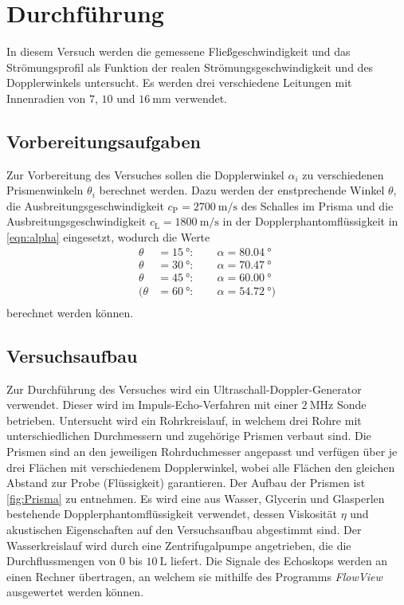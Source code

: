 \section{Durchführung}
\label{sec:Durchführung}
In diesem Versuch werden die gemessene Fließgeschwindigkeit und das Strömungsprofil als Funktion der realen Strömungsgeschwindigkeit und des Dopplerwinkels untersucht. 
Es werden drei verschiedene Leitungen mit Innenradien von $7$, $10$ und $\qty{16}{\milli\metre}$ verwendet. 

\subsection{Vorbereitungsaufgaben}
\label{subsec:Vorbereitung}
Zur Vorbereitung des Versuches sollen die Dopplerwinkel $\alpha_i$ zu verschiedenen Prismenwinkeln $\theta_i$ berechnet werden. Dazu werden der enstprechende Winkel
$\theta$, die Ausbreitungsgeschwindigkeit $c_\text{P} = \qty{2700}{\metre\per\second}$ des Schalles im Prisma und die Ausbreitungsgeschwindigkeit
$c_\text{L} = \qty{1800}{\metre\per\second}$ in der Dopplerphantomflüssigkeit in \autoref{eqn:alpha} eingesetzt, wodurch die Werte
\begin{align*}
    \theta &= \qty{15}{\degree}: \qquad \alpha = \qty{80.04}{\degree} \\
    \theta &= \qty{30}{\degree}: \qquad \alpha = \qty{70.47}{\degree} \\
    \theta &= \qty{45}{\degree}: \qquad \alpha = \qty{60.00}{\degree} \\
    (\theta &= \qty{60}{\degree}: \qquad \alpha = \qty{54.72}{\degree}) \\
\end{align*} 
berechnet werden können.

\subsection{Versuchsaufbau}
\label{subsec:Aufbau}
Zur Durchführung des Versuches wird ein Ultraschall-Doppler-Generator verwendet. Dieser wird im Impuls-Echo-Verfahren mit einer $\qty{2}{\mega\hertz}$ Sonde betrieben.
Untersucht wird ein Rohrkreislauf, in welchem drei Rohre mit unterschiedlichen Durchmessern und zugehörige Prismen verbaut sind. Die Prismen sind an den jeweiligen
Rohrduchmesser angepasst und verfügen über je drei Flächen mit verschiedenem Dopplerwinkel, wobei alle Flächen den gleichen Abstand zur Probe (Flüssigkeit) garantieren.  
Der Aufbau der Prismen ist \autoref{fig:Prisma} zu entnehmen. Es wird eine aus Wasser, Glycerin und
Glasperlen bestehende Dopplerphantomflüssigkeit verwendet, dessen Viskosität $\eta$ und akustischen Eigenschaften auf den Versuchsaufbau abgestimmt sind.
Der Wasserkreislauf wird durch eine Zentrifugalpumpe angetrieben, die die Durchflussmengen von $0$ bis $\qty{10}{\liter}$ liefert.
Die Signale des Echoskops werden an einen Rechner übertragen, an welchem sie mithilfe des Programms \textit{FlowView} ausgewertet werden können.

